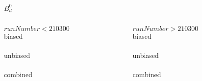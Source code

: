 \begin{frame}{$B_d^0$}
  
  \begin{columns}
  
    \begin{column}{0.45\textwidth}
    $runNumber<210300$\\[3mm]
    {biased} \\[2mm]
    \resizebox{\textwidth}{!}{}\\[5mm]
    {unbiased} \\[2mm]
    \resizebox{\textwidth}{!}{}\\[5mm]
    {combined} \\[2mm]
    \resizebox{\textwidth}{!}{}\\
    \end{column}
  
    \begin{column}{0.45\textwidth}
    $runNumber>210300$\\[3mm]
    {biased} \\[2mm]
    \resizebox{\textwidth}{!}{}\\[5mm]
    {unbiased} \\[2mm]
    \resizebox{\textwidth}{!}{}\\[5mm]
    {combined} \\[2mm]
    \resizebox{\textwidth}{!}{}\\
    \end{column}
  
  \end{columns}

\end{frame}




